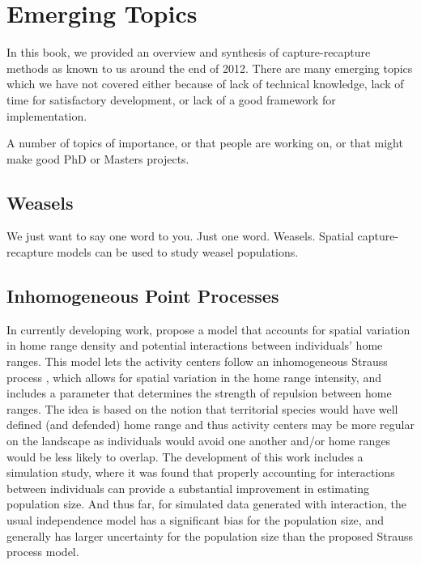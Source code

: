 \section{Emerging Topics}


In this book, we provided an overview and synthesis of
capture-recapture methods as known to us around the end of 2012. There
are many emerging topics which we have not covered either because of
lack of technical knowledge, lack of time for satisfactory
development, or lack of a good framework for implementation.

A number of topics of importance, or that people are working on, or
that might make good PhD or Masters projects.

\subsection{Weasels} %

We just want to say one word to you. Just one word. Weasels. Spatial
capture-recapture models can be used to study weasel populations.


\subsection{Inhomogeneous Point Processes}

In currently developing work, \citet{reich_etal:2012}
propose a model that accounts for
spatial variation in home range density and potential interactions
between individuals' home ranges.  This model lets the activity
centers follow an inhomogeneous Strauss process
\citep{strauss:1975}, which allows for spatial variation
in the home range intensity, and includes a parameter that determines
the strength of repulsion between home ranges.   The idea is based on the notion
that territorial species would have well defined (and defended) home range and thus
activity centers may be more regular on the landscape as individuals would
avoid one another and/or home ranges would be less likely to overlap.
The development of this work includes a simulation study,
where it was found that properly accounting for interactions between
individuals can provide a substantial improvement in estimating
population size.  And thus far, for simulated data generated with interaction, the
usual independence model has a significant bias for the population
size, and generally has larger uncertainty for the population size
than the proposed Strauss process model.

